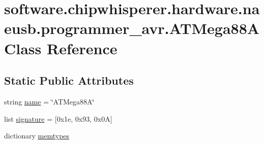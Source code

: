 \hypertarget{classsoftware_1_1chipwhisperer_1_1hardware_1_1naeusb_1_1programmer__avr_1_1ATMega88A}{}\section{software.\+chipwhisperer.\+hardware.\+naeusb.\+programmer\+\_\+avr.\+A\+T\+Mega88\+A Class Reference}
\label{classsoftware_1_1chipwhisperer_1_1hardware_1_1naeusb_1_1programmer__avr_1_1ATMega88A}
\subsection*{Static Public Attributes}
\begin{DoxyCompactItemize}
\item 
string \hyperlink{classsoftware_1_1chipwhisperer_1_1hardware_1_1naeusb_1_1programmer__avr_1_1ATMega88A_a3c08229bc645553842406ac6d3aed4a2}{name} = \char`\"{}A\+T\+Mega88\+A\char`\"{}
\item 
list \hyperlink{classsoftware_1_1chipwhisperer_1_1hardware_1_1naeusb_1_1programmer__avr_1_1ATMega88A_acc0af2cd29e9a889f66d8b0a4ad1200b}{signature} = \mbox{[}0x1e, 0x93, 0x0\+A\mbox{]}
\item 
dictionary \hyperlink{classsoftware_1_1chipwhisperer_1_1hardware_1_1naeusb_1_1programmer__avr_1_1ATMega88A_a29bea8d5e6fa561a24adde5292b38ea0}{memtypes}
\end{DoxyCompactItemize}


